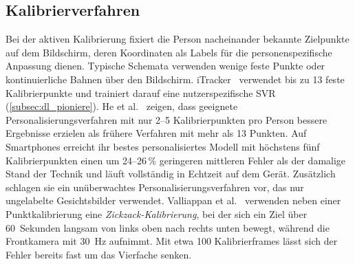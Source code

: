 \documentclass[
  11pt,
  a4paper,
  oneside,
  DIV=12,                 %
  BCOR=8mm,               %
  parskip=half,           %
  headings=normal,
  bibliography=totoc,     %
  listof=totoc            %
]{scrreprt}
\begin{document}
\subsection{Kalibrierverfahren}
\label{subsec:kalibrierung}
Bei der aktiven Kalibrierung fixiert die Person nacheinander bekannte Zielpunkte auf dem Bildschirm, deren Koordinaten als Labels für die personenspezifische Anpassung dienen. Typische Schemata verwenden wenige feste Punkte oder kontinuierliche Bahnen über den Bildschirm. iTracker~\cite{krafka2016itracker} verwendet bis zu 13 feste Kalibrierpunkte und trainiert darauf eine nutzerspezifische SVR (\cref{subsec:dl_pioniere}). He et al.~\cite{he2019ondevice} zeigen, dass geeignete Personalisierungsverfahren mit nur 2--5 Kalibrierpunkten pro Person bessere Ergebnisse erzielen als frühere Verfahren mit mehr als 13 Punkten. Auf Smartphones erreicht ihr bestes personalisiertes Modell mit höchstens fünf Kalibrierpunkten einen um 24--26\,\% geringeren mittleren Fehler als der damalige Stand der Technik und läuft vollständig in Echtzeit auf dem Gerät. Zusätzlich schlagen sie ein unüberwachtes Personalisierungsverfahren vor, das nur ungelabelte Gesichtsbilder verwendet. Valliappan et al.~\cite{valliappan2020smartphone} verwenden neben einer Punktkalibrierung eine \emph{Zickzack-Kalibrierung}, bei der sich ein Ziel über 60~Sekunden langsam von links oben nach rechts unten bewegt, während die Frontkamera mit \SI{30}{\hertz} aufnimmt. Mit etwa 100 Kalibrierframes lässt sich der Fehler bereits fast um das Vierfache senken.
\end{document}
